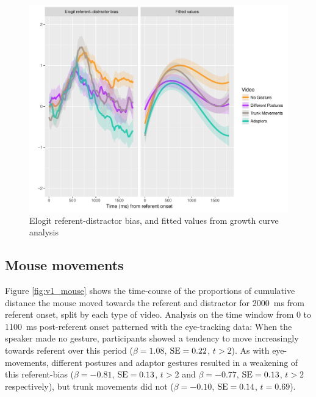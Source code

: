 \documentclass[a4paper,man,natbib]{apa6}
\newcommand{\resultsLM}[3]{$\beta = #1$, $\textnormal{SE} = #2$, $t #3$}
\begin{document}
\begin{figure}[Ht]
  \centering
	\includegraphics[width=\linewidth]{./img/e7_gcamodel.pdf}
  \caption{Elogit referent-distractor bias, and fitted values from growth curve analysis}
  \label{fig:v1_gca}
\end{figure}


\subsection{Mouse movements}
Figure \ref{fig:v1_mouse} shows the time-course of the proportions of cumulative distance the mouse moved towards the referent and distractor for 2000~ms from referent onset, split by each type of video.
Analysis on the time window from 0 to 1100~ms post-referent onset patterned with the eye-tracking data:
When the speaker made no gesture, participants showed a tendency to move increasingly towards referent over this period (\resultsLM{1.08}{0.22}{>2}).
As with eye-movements, different postures and adaptor gestures resulted in a weakening of this referent-bias (\resultsLM{-0.81}{0.13}{>2} and \resultsLM{-0.77}{0.13}{>2} respectively), but trunk movements did not (\resultsLM{-0.10}{0.14}{=0.69}). 
\end{document}
